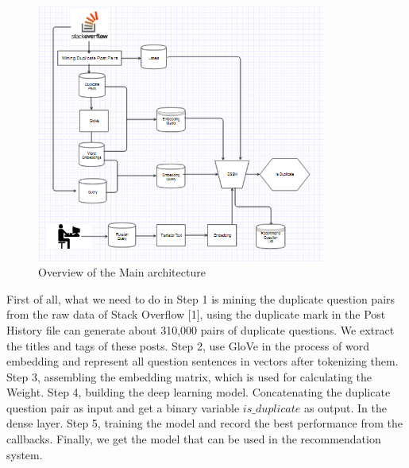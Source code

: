 	\begin{figure}[!h]
		\centering
		\includegraphics[width = 0.85\textwidth]{figures/model.png}
		\caption{Overview of the Main architecture}
	\end{figure}
	First of all, what we need to do in Step 1 is mining the duplicate question pairs from the raw data of Stack Overflow [1], using the duplicate mark in the Post History file can generate about 310,000 pairs of duplicate questions. We extract the titles and tags of these posts.  Step 2, use GloVe in the process of word embedding and represent all question sentences in vectors after tokenizing them. Step 3, assembling the embedding matrix, which is used for calculating the Weight. Step 4, building the deep learning model. Concatenating the duplicate question pair as input and get a binary variable $is\_duplicate$ as output. In the dense layer. Step 5, training the model and record the best performance from the callbacks. Finally, we get the model that can be used in the recommendation system.
